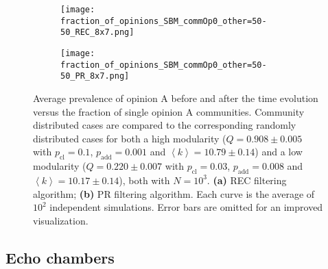 \documentclass[11 pt , letterpaper , twoside , openright]{book}
\begin{document}
\begin{figure}[H]
  \begin{subfigure}[b]{0.49\textwidth}
    \caption{}
  	\texttt{[image: fraction\_of\_opinions\_SBM\_commOp0\_other=50-50\_REC\_8x7.png]}
    \label{rec_comm}
  \end{subfigure}
  \begin{subfigure}[b]{0.49\textwidth}
    \caption{}
  	\texttt{[image: fraction\_of\_opinions\_SBM\_commOp0\_other=50-50\_PR\_8x7.png]}
    \label{pr_comm}
  \end{subfigure}
  \captionsetup{format=plain}
  \caption[Average prevalence of opinion A before and after the time evolution versus the fraction of single opinion A communities. Community distributed cases are compared to the corresponding randomly distributed cases for both a high modularity and a low modularity network. Results for the REC and PR filtering algorithms.]{Average prevalence of opinion A before and after the time evolution versus the fraction of single opinion A communities. Community distributed cases are compared to the corresponding randomly distributed cases for both a high modularity ($Q = 0.908 \pm 0.005$ with $p_{\text{cl}} = 0.1$, $p_{\text{add}} = 0.001$ and $\left<k\right> = 10.79 \pm 0.14$) and a low modularity ($Q = 0.220 \pm 0.007$ with $p_{\text{cl}} = 0.03$, $p_{\text{add}} = 0.008$ and $\left<k\right> = 10.17 \pm 0.14$), both with $N=10^3$. \textbf{(a)} REC filtering algorithm; \textbf{(b)} PR filtering algorithm. Each curve is the average of $10^2$ independent simulations. Error bars are omitted for an improved visualization. }
\label{fracOp0_vs_commOp0_other_50-50}
\end{figure}

\subsection{Echo chambers}\label{groupVSrandomECHO}
\end{document}

